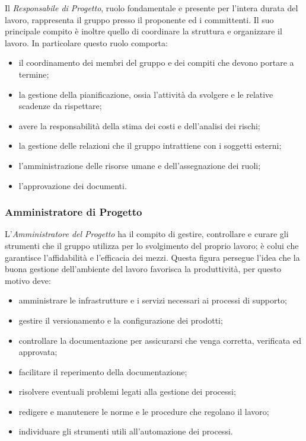 Il \textit{Responsabile di Progetto}, ruolo fondamentale e presente per l'intera durata del lavoro, rappresenta il gruppo presso il proponente ed i committenti. Il suo principale compito è inoltre quello di coordinare la struttura e organizzare il lavoro. In particolare questo ruolo comporta:
\begin{itemize}
	\item il coordinamento dei membri del gruppo e dei compiti che devono portare a termine;
	\item la gestione della pianificazione, ossia l'attività da svolgere e le relative scadenze da rispettare;
	\item avere la responsabilità della stima dei costi e dell'analisi dei rischi;
	\item la gestione delle relazioni che il gruppo intrattiene con i soggetti esterni;
	\item l'amministrazione delle risorse umane e dell'assegnazione dei ruoli;
	\item l'approvazione dei documenti.
\end{itemize}

\subsubsection{Amministratore di Progetto}\label{4.2.2.2}

L'\textit{Amministratore del Progetto} ha il compito di gestire, controllare e curare gli strumenti che il gruppo utilizza per lo svolgimento del proprio lavoro; è colui che garantisce l'affidabilità e l'efficacia dei mezzi. Questa figura persegue l'idea che la buona gestione dell'ambiente del lavoro favorisca la produttività, per questo motivo deve:
\begin{itemize}
	\item amministrare le infrastrutture e i servizi necessari ai processi di supporto;
	\item gestire il versionamento e la configurazione dei prodotti;
	\item controllare la documentazione per assicurarsi che venga corretta, verificata ed approvata;
	\item facilitare il reperimento della documentazione;
	\item risolvere eventuali problemi legati alla gestione dei processi;
	\item redigere e manutenere le norme e le procedure che regolano il lavoro;
	\item individuare gli strumenti utili all'automazione dei processi.
\end{itemize}

